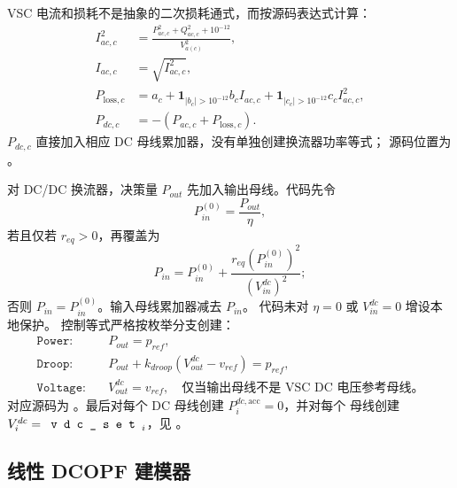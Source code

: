 VSC 电流和损耗不是抽象的二次损耗通式，而按源码表达式计算：
\begin{align}
 I_{ac,c}^2&=\frac{P_{ac,c}^2+Q_{ac,c}^2+10^{-12}}{V_{a(c)}^2},\\
 I_{ac,c}&=\sqrt{I_{ac,c}^2},\\
 P_{\mathrm{loss},c}&=a_c
 +\mathbf 1_{|b_c|>10^{-12}}b_c I_{ac,c}
 +\mathbf 1_{|c_c|>10^{-12}}c_c I_{ac,c}^2,\\
 P_{dc,c}&=-(P_{ac,c}+P_{\mathrm{loss},c}).
\end{align}
$P_{dc,c}$ 直接加入相应 DC 母线累加器，没有单独创建换流器功率等式；
源码位置为 。

对 DC/DC 换流器，决策量 $P_{out}$ 先加入输出母线。代码先令
\begin{equation}
 P_{in}^{(0)}=\frac{P_{out}}{\eta},
\end{equation}
若且仅若 $r_{eq}>0$，再覆盖为
\begin{equation}
 P_{in}=P_{in}^{(0)}+
 \frac{r_{eq}\left(P_{in}^{(0)}\right)^2}{\left(V_{in}^{dc}\right)^2};
\end{equation}
否则 $P_{in}=P_{in}^{(0)}$。输入母线累加器减去 $P_{in}$。
代码未对 $\eta=0$ 或 $V_{in}^{dc}=0$ 增设本地保护。
控制等式严格按枚举分支创建：
\begin{align}
 \texttt{Power}:&\quad P_{out}=p_{ref},\\
 \texttt{Droop}:&\quad P_{out}+k_{droop}(V_{out}^{dc}-v_{ref})=p_{ref},\\
 \texttt{Voltage}:&\quad V_{out}^{dc}=v_{ref},
 \quad\text{仅当输出母线不是 VSC DC 电压参考母线。}
\end{align}
对应源码为 。最后对每个 DC 母线创建
$P_i^{dc,\mathrm{acc}}=0$，并对每个  母线创建
$V_i^{dc}=\fld{vdc\_set}_i$，见 。

\subsection{线性 DCOPF 建模器}


